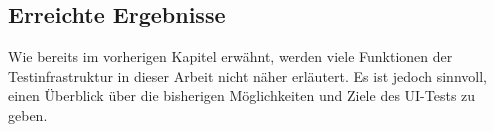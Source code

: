 \subsection{Erreichte Ergebnisse}\label{subsec:erreichte-ergebnisse}

Wie bereits im vorherigen Kapitel erwähnt, werden viele Funktionen
der Testinfrastruktur in dieser Arbeit nicht näher erläutert. Es ist
jedoch sinnvoll, einen Überblick über die bisherigen Möglichkeiten
und Ziele des UI-Tests zu geben.



